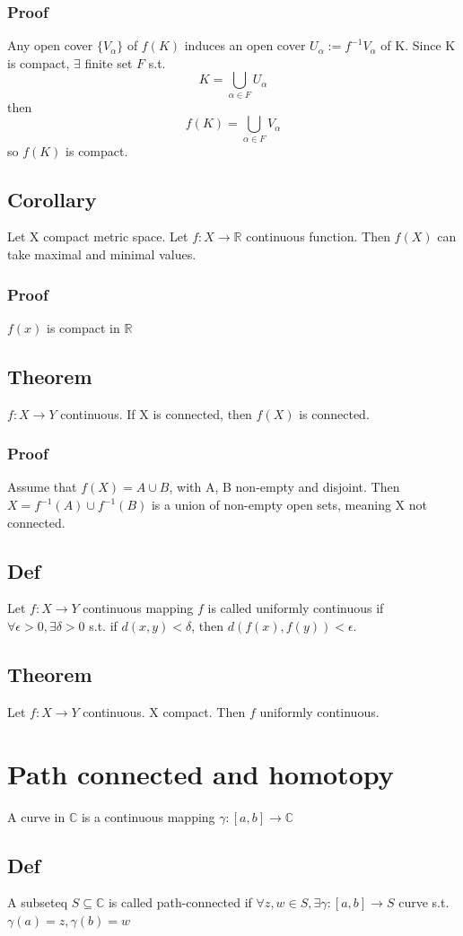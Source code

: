 \documentclass{book}
\begin{document}
\subsection*{Proof}
Any open cover $\{V_\alpha\}$ of $f(K)$ induces an open cover $U_\alpha:=f^{-1}V_\alpha$ of K. Since K is compact, $\exists$ finite set $F$ s.t. $$K=\bigcup\limits_{\alpha\in F}U_\alpha$$
then $$f(K)=\bigcup\limits_{\alpha\in F}V_\alpha$$
so $f(K)$ is compact.
\section{Corollary}
Let X compact metric space. Let $f:X\rightarrow \mathbb R$ continuous function. Then $f(X)$ can take maximal and minimal values.
\subsection*{Proof}
$f(x)$ is compact in $\mathbb R$
\section{Theorem}$f:X\rightarrow Y$ continuous. If X is connected, then $f(X)$ is connected.
\subsection{Proof}
Assume that $f(X)=A\cup B$, with A, B non-empty and disjoint. Then $X=f^{-1}(A)\cup f^{-1}(B)$ is a union of non-empty open sets, meaning X not connected.
\section{Def}
Let $f:X\rightarrow Y$ continuous mapping $f$ is called uniformly continuous if $\forall \epsilon>0,\exists \delta>0$ s.t. if $d(x,y)<\delta$, then $d(f(x),f(y))<\epsilon$.
\section{Theorem}Let $f:X\rightarrow Y$ continuous. X compact. Then $f$ uniformly continuous.
\chapter{Path connected and homotopy}
A curve in $\mathbb C$ is a continuous mapping $\gamma:[a,b]\rightarrow \mathbb C$
\section{Def}
A subseteq $S\subseteq \mathbb C$ is called path-connected if $\forall z,w\in S,\exists \gamma:[a,b]\rightarrow S$ curve s.t. $\gamma(a)=z,\gamma(b)=w$
\end{document}
